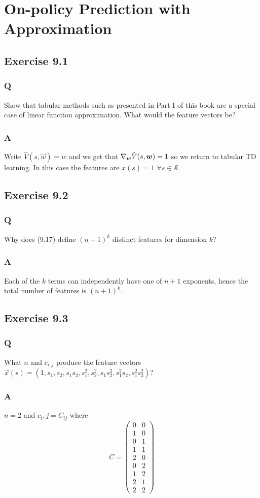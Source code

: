 \section{On-policy Prediction with Approximation}

\subsection{Exercise 9.1}
\subsubsection*{Q}
Show that tabular methods such as presented in Part I of this book are a special case of linear function approximation. What would the feature vectors be?
\subsubsection*{A}
Write $\hat{V}(s, \vec{w}) = w$ and we get that $\nabla_{\boldsymbol{w}} \hat{V}(s, \boldsymbol{w}) = 1$ so we return to tabular TD learning. In this case the features are $x(s) = 1$ $\forall s \in \mathcal{S}$.

\subsection{Exercise 9.2}
\subsubsection*{Q}
Why does (9.17) define $(n+1)^k$ distinct features for dimension $k$?
\subsubsection*{A}
Each of the $k$ terms can independently have one of $n+1$ exponents, hence the total number of features is $(n+1)^k$.

\subsection{Exercise 9.3}
\subsubsection*{Q}
What $n$ and $c_{i,j}$ produce the feature vectors $\vec{x}(s) = (1, s_1, s_2, s_1s_2, s_1^2, s_2^2, s_1s_2^2, s_1^2 s_2, s_1^2 s_2^2)$?
\subsubsection*{A}
$n=2$ and $c_i, j = C_{ij}$ where
\[
C =
\begin{pmatrix}
    0 & 0 \\
    1 & 0 \\
    0 & 1 \\
    1 & 1 \\
    2 & 0 \\
    0 & 2 \\
    1 & 2 \\
    2 & 1 \\
    2 & 2
\end{pmatrix}
\]

